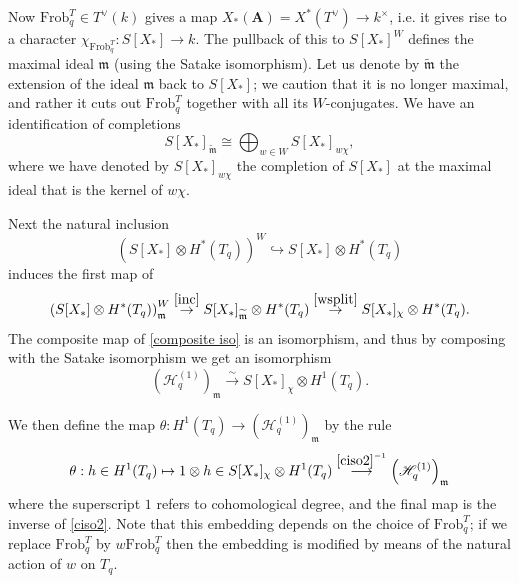 \documentclass[10pt]{amsart}
\newcommand{\Frob}{\mathrm{Frob}}
\theoremstyle{remark}
\begin{document}
 
 Now $\Frob_q^T \in T^{\vee}(k)$ gives a map $X_*(\mathbf{A}) = X^*(T^{\vee}) \rightarrow k^{\times}$, 
 i.e. it gives rise to a character $\chi_{\Frob_q^T}: S[X_*] \rightarrow k$.  The pullback of this to $S[X_*]^W$
 defines the maximal ideal $\mathfrak{m}$ (using the Satake isomorphism). 
 Let us denote by $\widetilde{\mathfrak{m}}$ the extension of the ideal $\mathfrak{m}$ back to $S[X_*]$;
 we caution that it is  no longer maximal, and rather it cuts out $\Frob_q^T$ together with all its $W$-conjugates. 
 We have an identification of completions
\begin{equation} \label{wsplit} S[X_*]_{\widetilde{\mathfrak{m}}} \cong \bigoplus_{w \in W} S[X_*]_{w \chi},\end{equation}
where we have denoted by $S[X_*]_{w\chi}$ the completion of $S[X_*]$ at the maximal ideal
that is the kernel of $w \chi$.

Next 
the natural inclusion  
\begin{equation} \label{inc}   \left( S[X_*] \otimes H^*(T_q) \right) ^{W} \hookrightarrow S[X_*] \otimes H^*(T_q) \end{equation}
induces the first map of  
\begin{equation} \label{composite iso}  \left( S[X_*] \otimes H^*(T_q) \right) ^{W}_{\mathfrak{m}} \stackrel{\eqref{inc}}{   \rightarrow}   S[X_*]_{\widetilde{\mathfrak{m}}} \otimes H^*(T_q) \stackrel{\eqref{wsplit}}{\rightarrow}  S[X_*]_{\chi} \otimes H^*(T_q). \end{equation}  
The composite map of \eqref{composite iso} is an isomorphism, and thus by composing with the Satake isomorphism we get an isomorphism
\begin{equation} \label{ciso2} \left( \mathscr{H}_q^{(1)} \right)_{\mathfrak{m}} \stackrel{\sim}{\rightarrow} S[X_*]_{\chi} \otimes H^1(T_q). \end{equation} 
 
 
 We then define the map $\theta: H^1(T_q) \rightarrow \left( \mathscr{H}_{q}^{(1)}\right)_{\mathfrak{m}} $ by the rule  
\begin{equation} \label{embedH1T} \theta:  h \in H^1(T_q) \mapsto 1 \otimes h \in S[X_*]_{\chi} \otimes H^1(T_q) \stackrel{\eqref{ciso2}^{-1}}{\longrightarrow}  \left( \mathscr{H}_{q}^{(1)}\right)_{\mathfrak{m}} \end{equation} 
where the superscript $1$ refers to cohomological degree, and the final map is the inverse of \eqref{ciso2}.
   Note that this embedding depends on the choice of $\Frob^T_q$; if we 
replace $\Frob^T_q$ by $w \Frob^T_q$ then the embedding is modified by means of the natural action of $w$ on $T_q$. 
\end{document}

